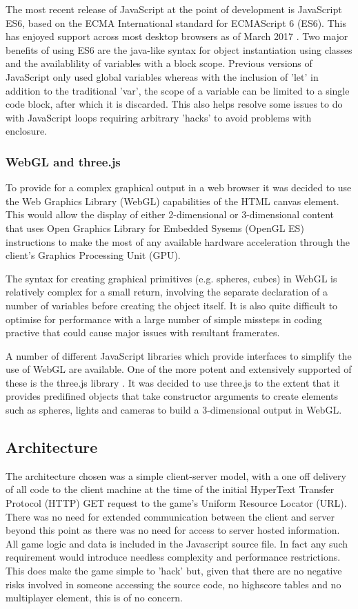\documentclass[twoside]{bhamthesis}
\begin{document}
The most recent release of JavaScript at the point of development is JavaScript ES6, based on the ECMA International standard for ECMAScript 6 (ES6). This has enjoyed support across most desktop browsers as of March 2017 \cite{zaytsev_ecmascript_2017}. Two major benefits of using ES6 are the java-like syntax for object instantiation using classes and the availablility of variables with a block scope. Previous versions of JavaScript only used global variables whereas with the inclusion of 'let' in addition to the traditional 'var', the scope of a variable can be limited to a single code block, after which it is discarded. This also helps resolve some issues to do with JavaScript loops requiring arbitrary 'hacks' to avoid problems with enclosure.


\subsubsection{WebGL and three.js}
To provide for a complex graphical output in a web browser it was decided to use the Web Graphics Library (WebGL) capabilities of the HTML canvas element. This would allow the display of either 2-dimensional or 3-dimensional content that uses Open Graphics Library for Embedded Sysems (OpenGL ES) instructions to make the most of any available hardware acceleration through the client's Graphics Processing Unit (GPU).

The syntax for creating graphical primitives (e.g. spheres, cubes) in WebGL is relatively complex for a small return, involving the separate declaration of a number of variables before creating the object itself. It is also quite difficult to optimise for performance with a large number of simple missteps in coding practive that could cause major issues with resultant framerates.

A number of different JavaScript libraries which provide interfaces to simplify the use of WebGL are available. One of the more potent and extensively supported of these is the three.js library \cite{cabello_three.js_????}. It was decided to use three.js to the extent that it provides predifined objects that take constructor arguments to create elements such as spheres, lights and cameras to build a 3-dimensional output in WebGL.

\subsection{Architecture}

The architecture chosen was a simple client-server model, with a one off delivery of all code to the client machine at the time of the initial HyperText Transfer Protocol (HTTP) GET request to the game's Uniform Resource Locator (URL). There was no need for extended communication between the client and server beyond this point as there was no need for access to server hosted information. All game logic and data is included in the Javascript source file. In fact any such requirement would introduce needless complexity and performance restrictions. This does make the game simple to 'hack' but, given that there are no negative risks involved in someone accessing the source code, no highscore tables and no multiplayer element, this is of no concern.
\end{document}
